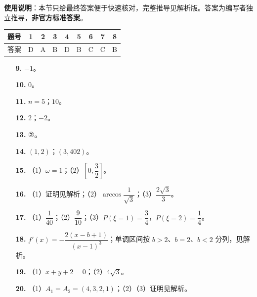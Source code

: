
\begin{gknotice}
\textbf{使用说明}：本节只给最终答案便于快速核对，完整推导见解析版。答案为编写者独立推导，\textbf{非官方标准答案}。
\end{gknotice}

\begin{center}\begin{tabular}{ccccccccc}
\toprule
题号 & 1 & 2 & 3 & 4 & 5 & 6 & 7 & 8 \\
\midrule
答案 & D & A & B & D & B & C & C & B \\
\bottomrule
\end{tabular}\end{center}

\begin{itemize}[leftmargin=2.6em]
  \item[\textbf{9.}] $-1$。
  \item[\textbf{10.}] $0$。
  \item[\textbf{11.}] $n=5$；$10$。
  \item[\textbf{12.}] $2$；$-2$。
  \item[\textbf{13.}] ②。
  \item[\textbf{14.}] $(1,2)$；$(3,402)$。
\end{itemize}

\begin{itemize}[leftmargin=2.6em]
  \item[\textbf{15.}] （1）$\omega=1$；（2）$\left[0,\dfrac32\right]$。
  \item[\textbf{16.}] （1）证明见解析；（2）$\arccos\dfrac1{\sqrt3}$；（3）$\dfrac{2\sqrt3}3$。
  \item[\textbf{17.}] （1）$\dfrac1{40}$；（2）$\dfrac9{10}$；（3）$P(\xi=1)=\dfrac34$，$P(\xi=2)=\dfrac14$。
  \item[\textbf{18.}] $f'(x)=-\dfrac{2(x-b+1)}{(x-1)^3}$；单调区间按 $b>2$、$b=2$、$b<2$ 分列，见解析。
  \item[\textbf{19.}] （1）$x+y+2=0$；（2）$4\sqrt3$。
  \item[\textbf{20.}] （1）$A_1=A_2=(4,3,2,1)$；（2）（3）证明见解析。
\end{itemize}
